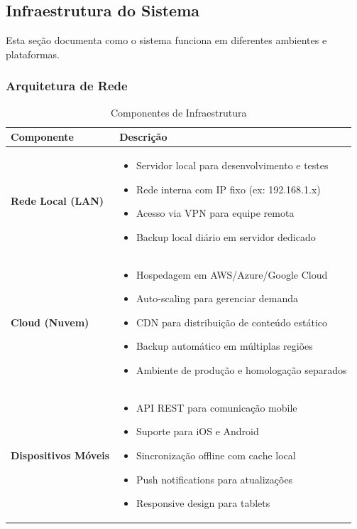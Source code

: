 \documentclass[11pt,a4paper]{article}
\begin{document}
\subsection{Infraestrutura do Sistema}

Esta seção documenta como o sistema funciona em diferentes ambientes e plataformas.

\subsubsection{Arquitetura de Rede}

\begin{table}[H]
\centering
\caption{Componentes de Infraestrutura}
\label{tab:infrastructure}
\begin{tabular}{|l|p{10cm}|}
\hline
\textbf{Componente} & \textbf{Descrição} \\
\hline
\textbf{Rede Local (LAN)} & 
\begin{itemize}[leftmargin=*, nosep]
    \item Servidor local para desenvolvimento e testes
    \item Rede interna com IP fixo (ex: 192.168.1.x)
    \item Acesso via VPN para equipe remota
    \item Backup local diário em servidor dedicado
\end{itemize} \\
\hline
\textbf{Cloud (Nuvem)} & 
\begin{itemize}[leftmargin=*, nosep]
    \item Hospedagem em AWS/Azure/Google Cloud
    \item Auto-scaling para gerenciar demanda
    \item CDN para distribuição de conteúdo estático
    \item Backup automático em múltiplas regiões
    \item Ambiente de produção e homologação separados
\end{itemize} \\
\hline
\textbf{Dispositivos Móveis} & 
\begin{itemize}[leftmargin=*, nosep]
    \item API REST para comunicação mobile
    \item Suporte para iOS e Android
    \item Sincronização offline com cache local
    \item Push notifications para atualizações
    \item Responsive design para tablets

\end{itemize}
\end{tabular}
\end{table}
\end{document}
